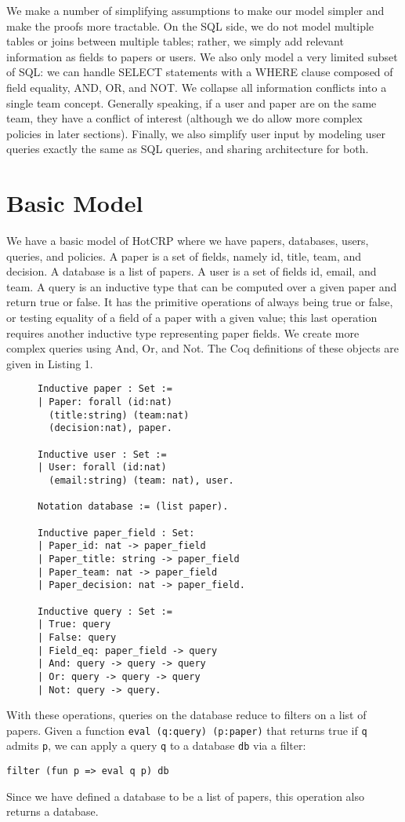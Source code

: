 \documentclass[11pt,journal]{IEEEtran}
\begin{document}
We make a number of simplifying assumptions to make our model simpler and make the proofs more tractable.  On the SQL side, we do not model multiple tables or joins between multiple tables; rather, we simply add relevant information as fields to papers or users.  We also only model a very limited subset of SQL: we can handle SELECT statements with a WHERE clause composed of field equality, AND, OR, and NOT.  We collapse all information conflicts into a single team concept.  Generally speaking, if a user and paper are on the same team, they have a conflict of interest (although we do allow more complex policies in later sections).  Finally, we also simplify user input by modeling user queries exactly the same as SQL queries, and sharing architecture for both.

\section{Basic Model}
\label{sec:model}

We have a basic model of HotCRP where we have papers, databases, users, queries, and policies. A paper is a set of fields, namely id, title, team, and decision. A database is a list of papers. A user is a set of fields id, email, and team. A query is an inductive type that can be computed over a given paper and return true or false. It has the primitive operations of always being true or false, or testing equality of a field of a paper with a given value; this last operation requires another inductive type representing paper fields. We create more complex queries using And, Or, and Not. The Coq definitions of these objects are given in Listing 1.
\begin{figure}
\begin{lstlisting}[caption=The basic model of HotCRP.]
Inductive paper : Set :=
| Paper: forall (id:nat)
  (title:string) (team:nat)
  (decision:nat), paper.
  
Inductive user : Set :=
| User: forall (id:nat)
  (email:string) (team: nat), user.

Notation database := (list paper).

Inductive paper_field : Set:
| Paper_id: nat -> paper_field
| Paper_title: string -> paper_field
| Paper_team: nat -> paper_field
| Paper_decision: nat -> paper_field.

Inductive query : Set :=
| True: query
| False: query
| Field_eq: paper_field -> query
| And: query -> query -> query
| Or: query -> query -> query
| Not: query -> query.
\end{lstlisting}
\end{figure}
With these operations, queries on the database reduce to filters on a list of papers.  Given a function \texttt{eval (q:query) (p:paper)} that returns true if \texttt{q} admits \texttt{p}, we can apply a query \texttt{q} to a database \texttt{db} via a filter:
\begin{verbatim}
filter (fun p => eval q p) db
\end{verbatim}
Since we have defined a database to be a list of papers, this operation also returns a database.
\end{document}
